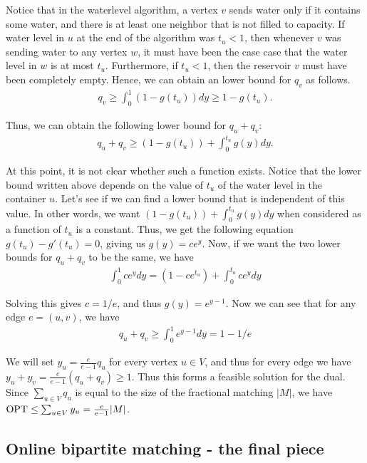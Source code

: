 Notice that in the waterlevel algorithm, a vertex $v$ sends water only if it
contains some water, and there is at least one neighbor that is not filled to
capacity. If water level in $u$ at the end of the algorithm was $t_u < 1$, then
whenever $v$ was sending water to any vertex $w$, it must have been the case
case that the water level in $w$ is at most $t_u$. Furthermore, if $t_u < 1$,
then the reservoir $v$ must have been completely empty. Hence, we can obtain an
lower bound for $q_v$ as follows.
\begin{align*}
  q_v \geq \int_{0}^1 (1 - g(t_u))dy \geq 1 - g(t_u).
\end{align*}

Thus, we can obtain the following lower bound for $q_u + q_v$:
\begin{align*}
  q_u + q_v \geq (1 - g(t_u)) + \int_0^{t_u} g(y) dy.
\end{align*}

At this point, it is not clear whether such a function exists. Notice that the
lower bound written above depends on the value of $t_u$ of the water level in
the container $u$. Let's see if we can find a lower bound that is independent of
this value. In other words, we want $(1-g(t_u)) + \int_0^{t_u} g(y)dy$ when
considered as a function of $t_u$ is a constant. Thus, we get the following
equation $ g(t_u) - g'(t_u) = 0$, giving us $g(y) = ce^y$. Now, if we want the
two lower bounds for $q_u+q_v$ to be the same, we have
\begin{align*}
  \int_0^1 ce^y dy = (1 - ce^{t_u}) + \int_0^{t_u} ce^y dy
\end{align*}

Solving this gives $c = 1/e$, and thus $g(y) = e^{y-1}$. Now we can see that for
any edge $e = (u,v)$, we have
\begin{align*}
  q_u + q_v \geq \int_0^1 e^{y-1}dy = 1 - 1/e
\end{align*}

We will set $y_u = \frac{e}{e-1} q_u$ for every vertex $u\in V$, and thus for
every edge we have $y_u + y_v = \frac{e}{e-1}(q_u + q_v) \geq 1$. Thus this
forms a feasible solution for the dual. Since $\sum_{u\in V} q_u$ is equal to
the size of the fractional matching $|M|$, we have
$\operatorname{OPT} \leq \sum_{u\in V} y_u = \frac{e}{e-1} |M|$.

\subsection{Online bipartite matching - the final piece}

